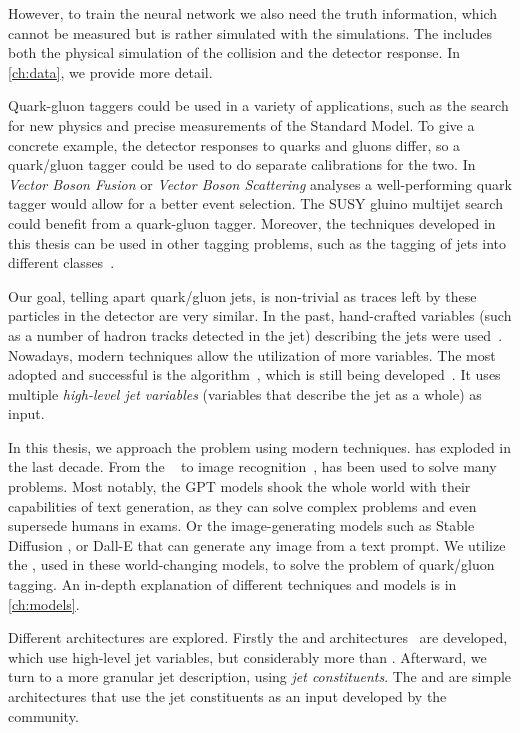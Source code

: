 However, to train the neural network we also need the truth information, which cannot be measured but is rather simulated with the \MC simulations.
The \MC includes both the physical simulation of the collision and the detector response.
In \cref{ch:data}, we provide more detail.

Quark-gluon taggers could be used in a variety of applications, such as the search for new physics and precise measurements of the Standard Model. 
To give a concrete example, the detector responses to quarks and gluons differ, so a quark/gluon tagger could be used to do separate calibrations for the two.
In \emph{Vector Boson Fusion} or \emph{Vector Boson Scattering} analyses a well-performing quark tagger would allow for a better event selection.
The SUSY gluino multijet search \cite{susy} could benefit from a quark-gluon tagger.
Moreover, the techniques developed in this thesis can be used in other tagging problems, such as the tagging of jets into different classes~\cite{part}.

Our goal, telling apart quark/gluon jets, is non-trivial as traces left by these particles in the detector are very similar.
In the past, hand-crafted variables (such as a number of hadron tracks detected in the jet) describing the jets were used~\cite{ntrk_tag}.
Nowadays, modern \ml techniques allow the utilization of more variables.
The most adopted and successful is the \bdt algorithm~\cite{bdt}, which is still being developed~\cite{bdt_tag}.
It uses multiple \emph{high-level jet variables} (variables that describe the jet as a whole) as input.

In this thesis, we approach the problem using modern \dl techniques.
\dl has exploded in the last decade.
From the \nlp~\cite{bert} to image recognition~\cite{deit3}, \dl has been used to solve many problems.
Most notably, the GPT models \cite{gpt3,gpt4} shook the whole world with their capabilities of text generation, as they can solve complex problems and even supersede humans in exams. 
Or the image-generating models such as Stable Diffusion \cite{stable_diff}, or Dall-E \cite{dalle} that can generate any image from a text prompt.
We utilize the \dl, used in these world-changing models, to solve the problem of quark/gluon tagging.
An in-depth explanation of different \dl techniques and models is in \cref{ch:models}.

Different architectures are explored.
Firstly the \fc and \highway architectures~\cite{highway,mlp} are developed, which use high-level jet variables, but considerably more than \bdt. 
Afterward, we turn to a more granular jet description, using \emph{jet constituents}. 
The \EFN and \PFN \cite{efn} are simple architectures that use the jet constituents as an input developed by the \HEP community.

